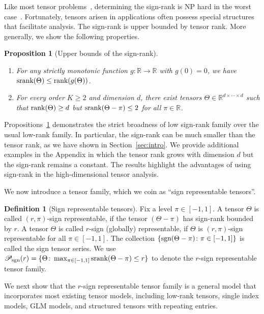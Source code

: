 \documentclass{article}
\theoremstyle{plain}
\newtheorem{prop}{Proposition}
\theoremstyle{definition}
\newtheorem{defn}{Definition}
\def\sign{\textup{sgn}}
\def\srank{\textup{srank}}
\def\rank{\textup{rank}}
\def\caliP{\mathscr{P}_{\textup{sgn}}}
\begin{document}
Like most tensor problems~\citep{hillar2013most}, determining the sign-rank is NP hard in the worst case~\citep{alon2016sign}. Fortunately, tensors arisen in applications often possess special structures that facilitate analysis. The sign-rank is upper bounded by tensor rank. More generally, we show the following properties.
\vspace{.1cm}
\begin{prop}[Upper bounds of the sign-rank]~\label{cor:monotonic} \hfill
\begin{enumerate}[label={2.\arabic*},wide, labelwidth=!, labelindent=0pt,itemsep=0ex,parsep=0ex,topsep=-7pt]
\item[(a)] [Upper bounds] For any strictly monotonic function $g\colon \mathbb{R}\to \mathbb{R}$ with $g(0)=0$,  we have $\textup{srank}(\Theta)\leq\rank(g(\Theta))$.
\item[(b)] [Broadness] For every order $K\geq 2$ and dimension $d$, there exist tensors $\Theta\in\mathbb{R}^{d\times \cdots \times d}$ such that $\rank(\Theta)\geq d$ but $\srank(\Theta-\pi)\leq 2$ for all $\pi\in\mathbb{R}$.  
\end{enumerate}
\end{prop}
Propositions~\ref{cor:monotonic} demonstrates the strict broadness of low sign-rank family over the usual low-rank family. 
In particular, the sign-rank can be much smaller than the tensor rank, as we have shown in Section~\ref{sec:intro}. We provide additional examples in the Appendix in which the tensor rank grows with dimension $d$ but the sign-rank remains a constant. The results highlight the advantages of using sign-rank in the high-dimensional tensor analysis. 

We now introduce a tensor family, which we coin as ``sign representable tensors''.
\begin{defn}[Sign representable tensors] 
Fix a level $\pi\in[-1,1]$. A tensor $\Theta$ is called $(r,\pi)$-sign representable, if the tensor $(\Theta-\pi)$ has sign-rank bounded by $r$. A tensor $\Theta$ is called $r$-sign (globally) representable, if $\Theta$ is $(r,\pi)$-sign representable for all $\pi\in[-1,1]$. The collection $\{\sign(\Theta-\pi)\colon \pi \in[-1,1]\}$ is called the sign tensor series. 
We use $\caliP(r)=\{\Theta\colon \max_{\pi\in[-1,1]}\srank(\Theta-\pi)\leq r\}$ to denote the $r$-sign representable tensor family.
\end{defn}

We next show that the $r$-sign representable tensor family is a general model that incorporates most existing tensor models, including low-rank tensors, single index models, GLM models, and structured tensors with repeating entries. 
\end{document}
